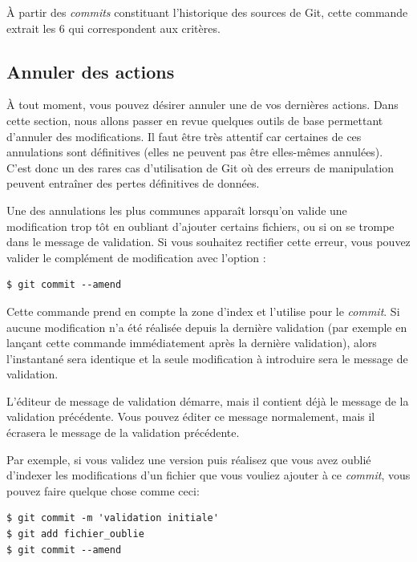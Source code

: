 À partir des  \emph{commits} constituant l'historique des sources de Git, cette commande extrait les 6 qui correspondent aux critères.

\subsection{Annuler des actions}
\label{sec:git:undoing}

À tout moment, vous pouvez désirer annuler une de vos dernières actions.
Dans cette section, nous allons passer en revue quelques outils de base permettant d'annuler des modifications.
Il faut être très attentif car certaines de ces annulations sont définitives (elles ne peuvent pas être elles-mêmes annulées).
C'est donc un des rares cas d'utilisation de Git où des erreurs de manipulation peuvent entraîner des pertes définitives de données.

Une des annulations les plus communes apparaît lorsqu'on valide une modification trop tôt en oubliant d'ajouter certains fichiers, ou si on se trompe dans le message de validation.
Si vous souhaitez rectifier cette erreur, vous pouvez valider le complément de modification avec l'option :
\begin{Schunk}
\begin{Verbatim}
$ git commit --amend
\end{Verbatim}
\end{Schunk}

Cette commande prend en compte la zone d'index et l'utilise pour le \emph{commit}.
Si aucune modification n'a été réalisée depuis la dernière validation (par exemple en lançant cette commande immédiatement après la dernière validation), alors l'instantané sera identique et la seule modification à introduire sera le message de validation.

L'éditeur de message de validation démarre, mais il contient déjà le message de la validation précédente.
Vous pouvez éditer ce message normalement, mais il écrasera le message de la validation précédente.

Par exemple, si vous validez une version puis réalisez que vous avez oublié d'indexer les modifications d'un fichier que vous vouliez ajouter à ce \emph{commit}, vous pouvez faire quelque chose comme ceci:
\begin{Schunk}
\begin{Verbatim}
$ git commit -m 'validation initiale'
$ git add fichier_oublie
$ git commit --amend
\end{Verbatim}
\end{Schunk}

